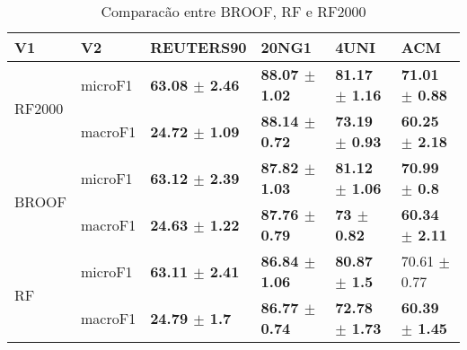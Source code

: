 \documentclass[]{article}
\begin{document}
\begin{table}[ht]
\centering
\begin{tabular}{llllll}
  \hline
V1 & V2 & REUTERS90 & 20NG1 & 4UNI & ACM \\ 
  \hline
\multirow{2}{*}{RF2000} & microF1 & \bf{63.08 $\pm$  2.46} & \bf{88.07 $\pm$  1.02} & \bf{81.17 $\pm$  1.16} & \bf{71.01 $\pm$  0.88} \\ 
   & macroF1 & \bf{24.72 $\pm$  1.09} & \bf{88.14 $\pm$  0.72} & \bf{73.19 $\pm$  0.93} & \bf{60.25 $\pm$  2.18} \\ 
  \multirow{2}{*}{BROOF} & microF1 & \bf{63.12 $\pm$  2.39} & \bf{87.82 $\pm$  1.03} & \bf{81.12 $\pm$  1.06} & \bf{70.99 $\pm$  0.8} \\ 
   & macroF1 & \bf{24.63 $\pm$  1.22} & \bf{87.76 $\pm$  0.79} & \bf{73 $\pm$  0.82} & \bf{60.34 $\pm$  2.11} \\ 
  \multirow{2}{*}{RF} & microF1 & \bf{63.11 $\pm$  2.41} & \bf{86.84 $\pm$  1.06} & \bf{80.87 $\pm$  1.5} & 70.61 $\pm$  0.77 \\ 
   & macroF1 & \bf{24.79 $\pm$  1.7} & \bf{86.77 $\pm$  0.74} & \bf{72.78 $\pm$  1.73} & \bf{60.39 $\pm$  1.45} \\ 
   \hline
\end{tabular}
\caption{Comparacão entre BROOF, RF e RF2000} 
\end{table}
\end{document}
